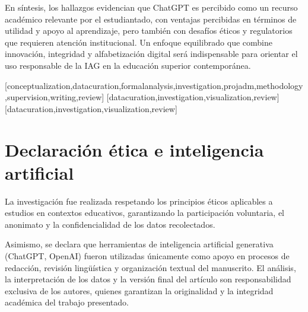 \documentclass[spanish]{textolivre}
\begin{document}
En síntesis, los hallazgos evidencian que ChatGPT es percibido como un recurso académico relevante por el estudiantado, con ventajas percibidas en términos de utilidad y apoyo al aprendizaje, pero también con desafíos éticos y regulatorios que requieren atención institucional. Un enfoque equilibrado que combine innovación, integridad y alfabetización digital será indispensable para orientar el uso responsable de la IAG en la educación superior contemporánea.



\printbibliography\label{sec-bib}


\begin{contributors}
[conceptualization,datacuration,formalanalysis,investigation,projadm,methodology,supervision,writing,review]
[datacuration,investigation,visualization,review]
[datacuration,investigation,visualization,review]
\end{contributors}


\begin{dataavailability}
\end{dataavailability}

\section*{\fontsize{10}{12}\selectfont Declaración ética e inteligencia artificial}
La investigación fue realizada respetando los principios éticos aplicables a estudios en contextos educativos, garantizando la participación voluntaria, el anonimato y la confidencialidad de los datos recolectados.

Asimismo, se declara que herramientas de inteligencia artificial generativa (ChatGPT, OpenAI) fueron utilizadas únicamente como apoyo en procesos de redacción, revisión lingüística y organización textual del manuscrito. El análisis, la interpretación de los datos y la versión final del artículo son responsabilidad exclusiva de los autores, quienes garantizan la originalidad y la integridad académica del trabajo presentado.
\end{document}
